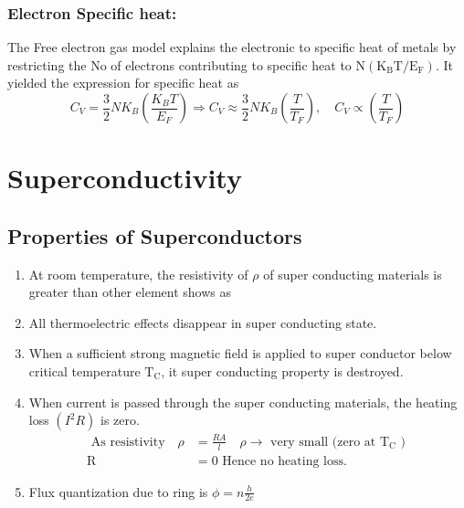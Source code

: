 \subsubsection{Electron Specific heat:}
The Free electron gas model explains the electronic to specific heat of metals by restricting the No of electrons contributing to specific heat to $\mathrm{N}\left(\mathrm{K}_{\mathrm{B}} \mathrm{T} / \mathrm{E}_{\mathrm{F}}\right)$. It yielded the expression for specific heat as
$$C_{V}=\frac{3}{2} N K_{B}\left(\frac{K_{B} T}{E_{F}}\right) \Rightarrow C_{V} \approx \frac{3}{2} N K_{B}\left(\frac{T}{T_{F}}\right), \quad C_{V} \propto\left(\frac{T}{T_{F}}\right)$$
\section{Superconductivity}
\subsection{Properties of Superconductors}
\begin{enumerate}
	\item At room temperature, the resistivity of $\rho$ of super conducting materials is greater than other element shows as
	\item All thermoelectric effects disappear in super conducting state.
	\item  When a sufficient strong magnetic field is applied to super conductor below critical temperature $\mathrm{T}_{\mathrm{C}}$, it super conducting property is destroyed.
	\item When current is passed through the super conducting materials, the heating loss $\left(I^{2} R\right)$ is zero.
	\begin{align*}
		\text{	As resistivity}\quad \rho&=\frac{R A}{l} \quad \rho \rightarrow \text { very small (zero at } \mathrm{T}_{\mathrm{C}} \text { ) }\\
		\mathrm{R}&=0 \text { Hence no heating loss. }
	\end{align*}
	\item Flux quantization due to ring is $\phi=n \frac{h}{2 e}$
\end{enumerate}
